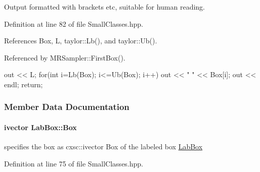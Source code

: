 \-Output formatted with brackets etc, suitable for human reading. 



\-Definition at line 82 of file \-Small\-Classes.\-hpp.



\-References \-Box, \-L, taylor\-::\-Lb(), and taylor\-::\-Ub().



\-Referenced by \-M\-R\-Sampler\-::\-First\-Box().


\begin{DoxyCode}
    {
      out << L;
      for(int i=Lb(Box); i<=Ub(Box); i++)
      {
        out << " " << Box[i];
      }
      out << endl;
      return;
    }
\end{DoxyCode}


\subsubsection{\-Member \-Data \-Documentation}
\hypertarget{classLabBox_a65253d570e3236bde747ddfabc7c6849}{
\paragraph[{\-Box}]{\setlength{\rightskip}{0pt plus 5cm}ivector {\bf \-Lab\-Box\-::\-Box}}}\label{classLabBox_a65253d570e3236bde747ddfabc7c6849}


specifies the box as cxsc\-::ivector \-Box of the labeled box \hyperlink{classLabBox}{\-Lab\-Box} 



\-Definition at line 75 of file \-Small\-Classes.\-hpp.



